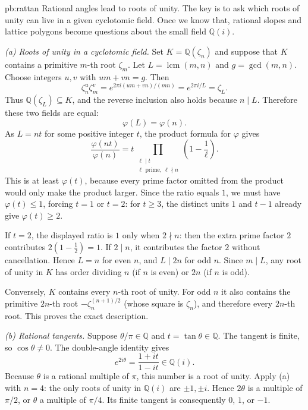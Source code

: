\begin{solution}{pb:rattan}
\idea Rational angles lead to roots of unity. The key is to ask which roots of unity can live in a given cyclotomic field. Once we know that, rational slopes and lattice polygons become questions about the small field $\mathbb Q(i)$.

\writeup \emph{(a) Roots of unity in a cyclotomic field.}
Set $K=\mathbb Q(\zeta_n)$ and suppose that $K$ contains a primitive $m$-th root $\zeta_m$. Let $L=\operatorname{lcm}(m,n)$ and $g=\gcd(m,n)$. Choose integers $u,v$ with $um+vn=g$. Then
\[
\zeta_n^u\zeta_m^v
=e^{2\pi i(um+vn)/(mn)}
=e^{2\pi i/L}=\zeta_L.
\]
Thus $\mathbb Q(\zeta_L)\subseteq K$, and the reverse inclusion also holds because $n\mid L$. Therefore these two fields are equal:
\[
\varphi(L)=\varphi(n).
\]
As $L=nt$ for some positive integer $t$, the product formula for $\varphi$ gives
\[
\frac{\varphi(nt)}{\varphi(n)}
=t\prod_{\substack{\ell\mid t\\\ell\text{ prime},\,\ell\nmid n}}
\left(1-\frac1\ell\right).
\]
This is at least $\varphi(t)$, because every prime factor omitted from the product would only make the product larger. Since the ratio equals $1$, we must have $\varphi(t)\le1$, forcing $t=1$ or $t=2$: for $t\ge3$, the distinct units $1$ and $t-1$ already give $\varphi(t)\ge2$.

If $t=2$, the displayed ratio is $1$ only when $2\nmid n$: then the extra prime factor $2$ contributes $2(1-\frac12)=1$. If $2\mid n$, it contributes the factor $2$ without cancellation. Hence $L=n$ for even $n$, and $L\mid2n$ for odd $n$. Since $m\mid L$, any root of unity in $K$ has order dividing $n$ (if $n$ is even) or $2n$ (if $n$ is odd).

Conversely, $K$ contains every $n$-th root of unity. For odd $n$ it also contains the primitive $2n$-th root $-\zeta_n^{(n+1)/2}$ (whose square is $\zeta_n$), and therefore every $2n$-th root. This proves the exact description.

\emph{(b) Rational tangents.}
Suppose $\theta/\pi\in\mathbb Q$ and $t=\tan\theta\in\mathbb Q$. The tangent is finite, so $\cos\theta\ne0$. The double-angle identity gives
\[
e^{2i\theta}=\frac{1+it}{1-it}\in\mathbb Q(i).
\]
Because $\theta$ is a rational multiple of $\pi$, this number is a root of unity. Apply (a) with $n=4$: the only roots of unity in $\mathbb Q(i)$ are $\pm1,\pm i$. Hence $2\theta$ is a multiple of $\pi/2$, or $\theta$ a multiple of $\pi/4$. Its finite tangent is consequently $0$, $1$, or $-1$.


\end{solution}
